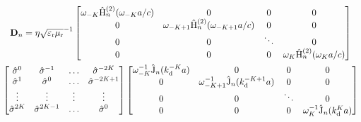 \begin{figure*}
\setcounter{tempEQCounter}{\value{equation}}
\setcounter{equation}{44}
\begin{multline}
    \mathbf{D}_n = \eta \sqrt{\varepsilon_{\mathrm{r}}\mu_{\mathrm{r}}}^{-1} 
    \begin{bmatrix}
    \omega_{-K}\hat{\mathrm{H}}^{(2)}_n(\omega_{-K} a/c) & 0 & 0 & 0 \\
    0 & \omega_{-K+1}\hat{\mathrm{H}}^{(2)}_n(\omega_{-K+1} a/c) & 0 & 0\\
    0 & 0 & \ddots & 0\\
    0 & 0 & 0 & \omega_{K}\hat{\mathrm{H}}^{(2)}_n(\omega_{K} a/c)
    \end{bmatrix}\\
\begin{bmatrix}
    \hat{\sigma}^{0} &  \hat{\sigma}^{-1} & \hdots & \hat{\sigma}^{-2K} \\
    \hat{\sigma}^{1} &  \hat{\sigma}^0 & \hdots & \hat{\sigma}^{-2K+1} \\
    \vdots & \vdots & \vdots & \vdots\\
    \hat{\sigma}^{2K} &  \hat{\sigma}^{2K-1} & \hdots & \hat{\sigma}^0 \\
    \end{bmatrix}
    \begin{bmatrix}
    \omega_{-K}^{-1}\hat{\mathrm{J}}_n(k^{-K}_{\mathrm{d}}a) & 0 & 0 & 0 \\
    0 & \omega_{-K+1}^{-1}\hat{\mathrm{J}}_n(k^{-K+1}_{\mathrm{d}}a) & 0 & 0\\
    0 & 0 & \ddots & 0\\
    0 & 0 & 0 & \omega_{K}^{-1}\hat{\mathrm{J}}_n(k^{K}_{\mathrm{d}}a)
    \end{bmatrix}
    \label{eq:dmatrix-long}
\end{multline}
\hrulefill
\vspace*{4pt}
\end{figure*}
\setcounter{equation}{\value{tempEQCounter}}